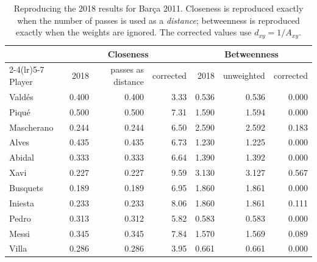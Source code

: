 \begin{table}[t]
\centering\small
\caption{Reproducing the 2018 results for Barça 2011. Closeness is reproduced exactly when the number of passes is used as a \emph{distance}; betweenness is reproduced exactly when the weights are ignored. The corrected values use $d_{xy} = 1/A_{xy}$.}
\label{tab:reproduction}
\begin{tabular}{lrrrrrr}
\toprule
 & \multicolumn{3}{c}{Closeness} & \multicolumn{3}{c}{Betweenness} \\
\cmidrule(lr){2-4}\cmidrule(lr){5-7}
Player & 2018 & passes as distance & corrected & 2018 & unweighted & corrected \\
\midrule
Valdés & 0.400 & 0.400 & 3.33 & 0.536 & 0.536 & 0.000 \\
Piqué & 0.500 & 0.500 & 7.31 & 1.590 & 1.594 & 0.000 \\
Mascherano & 0.244 & 0.244 & 6.50 & 2.590 & 2.592 & 0.183 \\
Alves & 0.435 & 0.435 & 6.73 & 1.230 & 1.225 & 0.000 \\
Abidal & 0.333 & 0.333 & 6.64 & 1.390 & 1.392 & 0.000 \\
Xavi & 0.227 & 0.227 & 9.59 & 3.130 & 3.127 & 0.567 \\
Busquets & 0.189 & 0.189 & 6.95 & 1.860 & 1.861 & 0.000 \\
Iniesta & 0.233 & 0.233 & 8.06 & 1.860 & 1.861 & 0.111 \\
Pedro & 0.313 & 0.312 & 5.82 & 0.583 & 0.583 & 0.000 \\
Messi & 0.345 & 0.345 & 7.84 & 1.570 & 1.569 & 0.089 \\
Villa & 0.286 & 0.286 & 3.95 & 0.661 & 0.661 & 0.000 \\
\bottomrule
\end{tabular}
\end{table}
